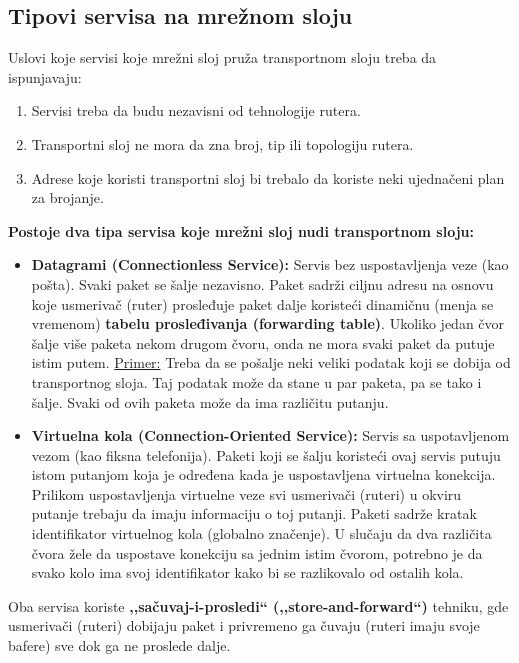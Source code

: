 \documentclass[a4paper]{article}
\begin{document}
    \subsection{Tipovi servisa na mrežnom sloju}
        Uslovi koje servisi koje mrežni sloj pruža transportnom sloju treba da ispunjavaju:
        \begin{enumerate}
            \item Servisi treba da budu nezavisni od tehnologije rutera.
            \item Transportni sloj ne mora da zna broj, tip ili topologiju rutera.
            \item Adrese koje koristi transportni sloj bi trebalo da koriste
                  neki ujednačeni plan za brojanje.
        \end{enumerate}
        \textbf{Postoje dva tipa servisa koje mrežni sloj nudi transportnom sloju:}
        \begin{itemize}
            \item \textbf{Datagrami (Connectionless Service):} Servis bez uspostavljenja 
                  veze (kao pošta). Svaki paket se šalje nezavisno. Paket sadrži ciljnu adresu
                  na osnovu koje usmerivač (ruter) prosleđuje paket dalje koristeći dinamičnu
                  (menja se vremenom) \textbf{tabelu prosleđivanja (forwarding table)}. Ukoliko
                  jedan čvor šalje više paketa nekom drugom čvoru, onda ne mora svaki paket
                  da putuje istim putem. \underline{Primer:} Treba da se pošalje neki veliki podatak koji
                  se dobija od transportnog sloja. Taj podatak može da stane u par paketa, pa
                  se tako i šalje. Svaki od ovih paketa može da ima različitu putanju.
            \item \textbf{Virtuelna kola (Connection-Oriented Service):} Servis sa uspotavljenom
                  vezom (kao fiksna telefonija). Paketi koji se šalju koristeći ovaj servis
                  putuju istom putanjom koja je određena kada je uspostavljena virtuelna konekcija.
                  Prilikom uspostavljenja virtuelne veze svi usmerivači (ruteri) u okviru
                  putanje trebaju da imaju informaciju o toj putanji. Paketi sadrže kratak identifikator
                  virtuelnog kola (globalno značenje). U slučaju da dva različita čvora žele
                  da uspostave konekciju sa jednim istim čvorom, potrebno je da svako kolo
                  ima svoj identifikator kako bi se razlikovalo od ostalih kola.  
        \end{itemize}
        Oba servisa koriste \textbf{,,sačuvaj-i-prosledi`` (,,store-and-forward``)} tehniku, gde
        usmerivači (ruteri) dobijaju paket i privremeno ga čuvaju (ruteri imaju svoje bafere)
        sve dok ga ne proslede dalje.
\end{document}
